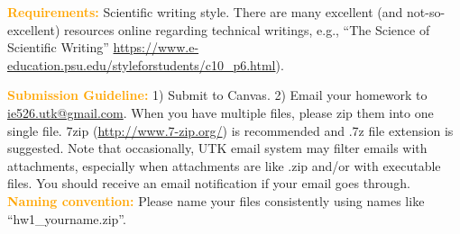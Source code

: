 \documentclass{article}
\begin{document}
\vskip 0.3in 


\textcolor{orange}{\bf Requirements:} Scientific writing style. There are many excellent (and not-so-excellent) resources online regarding technical writings, e.g., ``The Science of Scientific Writing'' \url{https://www.e-education.psu.edu/styleforstudents/c10_p6.html}).
\vskip 0.2in

\textcolor{orange}{\bf Submission Guideline:} 1) Submit to Canvas. 2) Email your homework to \url{ie526.utk@gmail.com}. When you have multiple files, please zip them
into one single file. 7zip (\url{http://www.7-zip.org/}) is recommended and .7z file extension is suggested. Note that occasionally, UTK email system may filter emails with attachments, especially when attachments are like .zip and/or with executable files. You should receive an email notification if your email goes through. 
\vskip 0.2in
\textcolor{orange}{\bf Naming convention:} Please name your files consistently using names like ``hw1\_yourname.zip''. 
\end{document}
